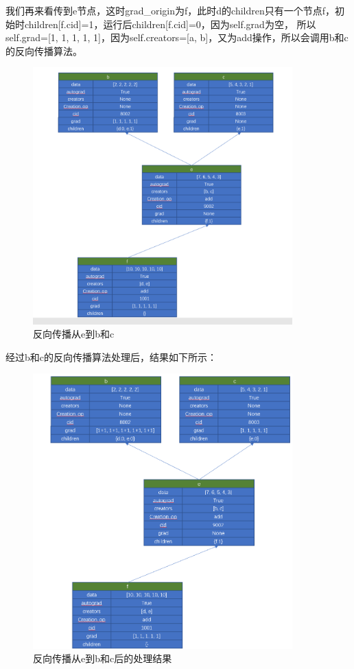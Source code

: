 我们再来看传到e节点，这时grad\_origin为f，此时d的children只有一个节点f，初始时children[f.cid]=1，运行后children[f.cid]=0，因为self.grad为空，
所以self.grad=[1, 1, 1, 1, 1]，因为self.creators=[a, b]，又为add操作，所以会调用b和c的反向传播算法。
\begin{figure}[h]
	\caption{反向传播从e到b和c}
	\label{p000021}
	\centering
	\includegraphics[width=10cm]{images/p000021}
\end{figure}
经过b和c的反向传播算法处理后，结果如下所示：
\begin{figure}[h]
	\caption{反向传播从e到b和c后的处理结果}
	\label{p000022}
	\centering
	\includegraphics[width=10cm]{images/p000022}
\end{figure}

